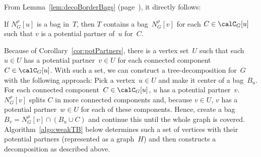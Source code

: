 From Lemma~\ref{lem:decoBorderBags} (page~\pageref{lem:decoBorderBags}), it directly follows:

\begin{corollary}
    \label{cor:potPartners}
If \( N_G^\rho[u] \) is a bag in~\( T \), then \( T \) contains a bag~\( N_G^\rho[v] \) for each \( C \in \calC_G[u] \) such that \( v \) is a potential partner of~\( u \) for~\( C \).
\end{corollary}

Because of Corollary~\ref{cor:potPartners}, there is a vertex set~$U$ such that each $u \in U$ has a potential partner~$v \in U$ for each connected component~$C \in \calC_G[u]$.
With such a set, we can construct a tree-decomposition for~$G$ with the following approach:
Pick a vertex~$u \in U$ and make it center of a bag~$B_u$.
For each connected component~$C \in \calC_G[u]$, $u$ has a potential partner~$v$.
$N_G^\rho[v]$ splits $C$ in more connected components and, because $v \in U$, $v$ has a potential partner~$w \in U$ for each of these components.
Hence, create a bag~$B_v = N_G^\rho[v] \cap (B_u \cup C)$ and continue this until the whole graph is covered.
Algorithm~\ref{algo:weakTB} below determines such a set of vertices with their potential partners (represented as a graph~$H$) and then constructs a decomposition as described above.

